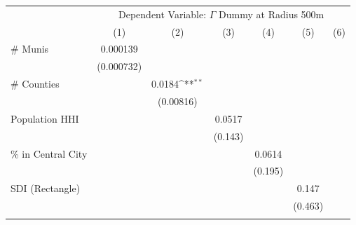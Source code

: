 {
\def\sym#1{\ifmmode^{#1}\else\(^{#1}\)\fi}
\begin{tabular}{l*{6}{c}}
\toprule
                    &\multicolumn{6}{c}{Dependent Variable: \(\Gamma\) Dummy at Radius 500m}                                                            \\
                    &\multicolumn{1}{c}{(1)}         &\multicolumn{1}{c}{(2)}         &\multicolumn{1}{c}{(3)}         &\multicolumn{1}{c}{(4)}         &\multicolumn{1}{c}{(5)}         &\multicolumn{1}{c}{(6)}         \\
\midrule
\# Munis            &    0.000139         &                     &                     &                     &                     &                     \\
                    &  (0.000732)         &                     &                     &                     &                     &                     \\
\addlinespace
\# Counties         &                     &      0.0184\sym{**} &                     &                     &                     &                     \\
                    &                     &   (0.00816)         &                     &                     &                     &                     \\
\addlinespace
Population HHI      &                     &                     &      0.0517         &                     &                     &                     \\
                    &                     &                     &     (0.143)         &                     &                     &                     \\
\addlinespace
\% in Central City  &                     &                     &                     &      0.0614         &                     &                     \\
                    &                     &                     &                     &     (0.195)         &                     &                     \\
\addlinespace
SDI (Rectangle)     &                     &                     &                     &                     &       0.147         &                     \\
                    &                     &                     &                     &                     &     (0.463)         &                     \\
\addlinespace

\end{tabular}}
